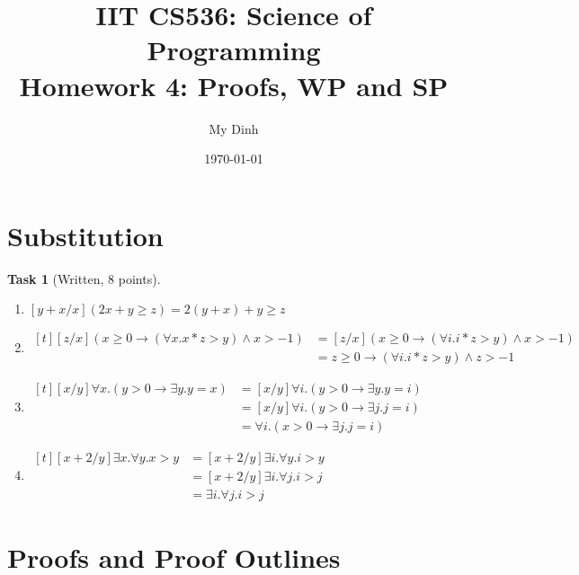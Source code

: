 \documentclass{article}
\title{IIT CS536: Science of Programming\\
  {\large Homework 4: Proofs, WP and SP}}
\author{My Dinh}
\date{\today}
\theoremstyle{task}
\newtheorem{task}{Task}[section]
\begin{document}
\maketitle

\section{Substitution}

\begin{task}[Written, 8 points]\
    \begin{enumerate}
        \item $[y+x/x](2x + y \geq z) = 2(y + x) + y \geq z$
        \item
            $
            \!
            \begin{aligned}[t]
                [z/x](x \geq 0 \rightarrow (\forall x. x * z > y) \wedge x > -1)
                &= [z/x](x \geq 0 \rightarrow (\forall i.i * z > y) \wedge x > -1) \\
                &= z \geq 0 \rightarrow (\forall i.i * z > y) \wedge z > -1
            \end{aligned}
            $
        \item
            $
            \!
            \begin{aligned}[t]
                [x/y]\forall x. (y > 0 \rightarrow \exists y. y = x)
                &= [x/y]\forall i. (y > 0 \rightarrow \exists y. y = i) \\
                &= [x/y]\forall i. (y > 0 \rightarrow \exists j. j = i) \\
                &= \forall i. (x > 0 \rightarrow \exists j. j = i)
            \end{aligned}
            $
        \item $
            \begin{aligned}[t]
                [x + 2/y]\exists x. \forall y. x > y &= [x + 2/y]\exists i. \forall y. i > y \\
                                                     &= [x + 2/y]\exists i. \forall j. i > j \\
                                                     &= \exists i. \forall j. i > j
            \end{aligned}
            $
    \end{enumerate}
\end{task}

\section{Proofs and Proof Outlines}
\end{document}
